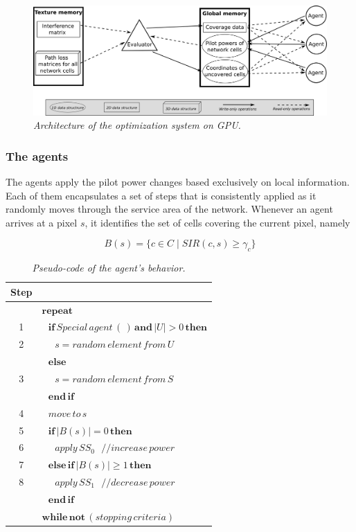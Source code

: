\begin{figure}
\centering

\includegraphics[width=1\textwidth]{07-experimental_evaluation/img/architecture}

\caption{\textit{Architecture of the optimization system on GPU.\label{fig:Architecture}}}
\end{figure}



\subsubsection{The agents}

The agents apply the pilot power changes based exclusively on local
information. Each of them encapsulates a set of steps that is consistently
applied as it randomly moves through the service area of the network.
Whenever an agent arrives at a pixel $s$, it identifies the set of
cells covering the current pixel, namely 

\begin{equation}
B(s)=\{c\in C\mid SIR(c,s)\ge\gamma_{c}\}
\end{equation}


\begin{table}
\caption{\textit{Pseudo-code of the agent's behavior.\label{tab:Agent-behavior}}}


\centering

\begin{tabular}{c|l}
\hline 
Step & \tabularnewline[\doublerulesep]
\hline 
 & $\mathbf{repeat}$\tabularnewline
1 & $\,\,\,\,\mathbf{if}\, Special\, agent\,(\,)\,\mathbf{and}\,|U|>0\,\mathbf{then}$\tabularnewline
2 & $\,\,\,\,\,\,\,\, s=random\, element\, from\, U$\tabularnewline
 & $\,\,\,\,\mathbf{else}$\tabularnewline
3 & $\,\,\,\,\,\,\,\, s=random\, element\, from\, S$\tabularnewline
 & $\,\,\,\,\mathbf{end\, if}$\tabularnewline
4 & $\,\,\,\, move\, to\, s$\tabularnewline
5 & $\,\,\,\,\mathbf{if}\,|B(s)|=0\,\mathbf{then}$\tabularnewline
6 & $\,\,\,\,\,\,\,\, apply\, SS_{0}\,\,\,\,//increase\, power$\tabularnewline
7 & $\,\,\,\,\mathbf{else\,}\mathbf{if}\,|B(s)|\ge1\,\mathbf{then}$\tabularnewline
8 & $\,\,\,\,\,\,\,\, apply\, SS_{1}\,\,\,\,//decrease\, power$\tabularnewline
 & $\,\,\,\,\mathbf{end\, if}$\tabularnewline
 & $\mathbf{while\,}\mathbf{not}\,(stopping\, criteria)$\tabularnewline
\hline 
\end{tabular}
\end{table}


